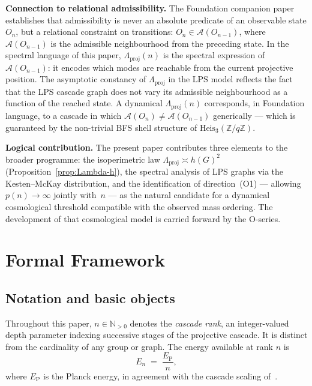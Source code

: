 \documentclass[12pt, a4paper]{article}
\theoremstyle{plain}
\theoremstyle{definition}
\theoremstyle{remark}
\begin{document}
      \medskip
      \noindent\textbf{Connection to relational admissibility.}
      The Foundation companion paper~\cite{Beau2026m} establishes that
      admissibility is never an absolute predicate of an observable state $O_n$, but
      a relational constraint on transitions: $O_n \in \mathcal{A}(O_{n-1})$, where
      $\mathcal{A}(O_{n-1})$ is the admissible neighbourhood from the preceding state.
      In the spectral language of this paper, $\Lambda_{\mathrm{proj}}(n)$ is the
      spectral expression of $\mathcal{A}(O_{n-1})$: it encodes which modes are
      reachable from the current projective position.
      The asymptotic constancy of $\Lambda_{\mathrm{proj}}$ in the LPS model reflects
      the fact that the LPS cascade graph does not vary its admissible neighbourhood
      as a function of the reached state.
      A dynamical $\Lambda_{\mathrm{proj}}(n)$ corresponds, in Foundation language, to
      a cascade in which $\mathcal{A}(O_n) \neq \mathcal{A}(O_{n-1})$ generically ---
      which is guaranteed by the non-trivial BFS shell structure of
      $\mathrm{Heis}_3(\mathbb{Z}/q\mathbb{Z})$.

      \medskip
      \noindent\textbf{Logical contribution.}
      The present paper contributes three elements to the broader programme:
      the isoperimetric law $\Lambda_{\mathrm{proj}} \asymp h(G)^2$
      (Proposition~\ref{prop:Lambda-h}), the spectral analysis of LPS graphs via the
      Kesten--McKay distribution, and the identification of direction~(O1) ---
      allowing $p(n) \to \infty$ jointly with~$n$ --- as the natural candidate for a
      dynamical cosmological threshold compatible with the observed mass ordering.
      The development of that cosmological model is carried forward by the O-series.
  \section{Formal Framework}
    \label{sec:framework}

    \subsection{Notation and basic objects}
      \label{sec:framework:notation}

      Throughout this paper, $n \in \mathbb{N}_{>0}$ denotes the \emph{cascade rank},
      an integer-valued depth parameter indexing successive stages of the projective cascade.
      It is distinct from the cardinality of any group or graph.
      The energy available at rank $n$ is
      \begin{equation}
        \label{eq:energy-rank}
        E_n \;=\; \frac{E_{\mathrm{P}}}{n},
      \end{equation}
      where $E_{\mathrm{P}}$ is the Planck energy, in agreement with the cascade
      scaling of~\cite{Beau2026a4}.
\end{document}
